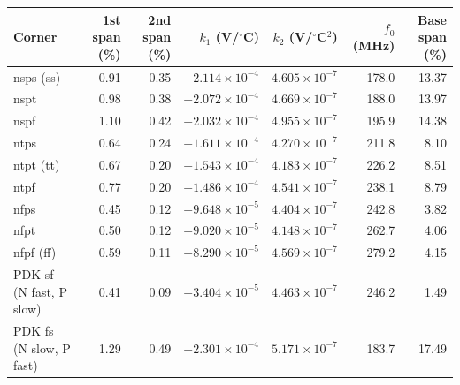 \begin{tabular}{lrrrrrr}\toprule
Corner & 1st span (\%) & 2nd span (\%) & $k_1$ (V/$^\circ$C) & $k_2$ (V/$^\circ$C$^2$) & $f_0$ (MHz) & Base span (\%) \\\midrule
nsps (ss) & 0.91 & 0.35 & $-2.114\times10^{-4}$ & $4.605\times10^{-7}$ & 178.0 & 13.37 \\
nspt & 0.98 & 0.38 & $-2.072\times10^{-4}$ & $4.669\times10^{-7}$ & 188.0 & 13.97 \\
nspf & 1.10 & 0.42 & $-2.032\times10^{-4}$ & $4.955\times10^{-7}$ & 195.9 & 14.38 \\
ntps & 0.64 & 0.24 & $-1.611\times10^{-4}$ & $4.270\times10^{-7}$ & 211.8 & 8.10 \\
ntpt (tt) & 0.67 & 0.20 & $-1.543\times10^{-4}$ & $4.183\times10^{-7}$ & 226.2 & 8.51 \\
ntpf & 0.77 & 0.20 & $-1.486\times10^{-4}$ & $4.541\times10^{-7}$ & 238.1 & 8.79 \\
nfps & 0.45 & 0.12 & $-9.648\times10^{-5}$ & $4.404\times10^{-7}$ & 242.8 & 3.82 \\
nfpt & 0.50 & 0.12 & $-9.020\times10^{-5}$ & $4.148\times10^{-7}$ & 262.7 & 4.06 \\
nfpf (ff) & 0.59 & 0.11 & $-8.290\times10^{-5}$ & $4.569\times10^{-7}$ & 279.2 & 4.15 \\
PDK sf (N fast, P slow) & 0.41 & 0.09 & $-3.404\times10^{-5}$ & $4.463\times10^{-7}$ & 246.2 & 1.49 \\
PDK fs (N slow, P fast) & 1.29 & 0.49 & $-2.301\times10^{-4}$ & $5.171\times10^{-7}$ & 183.7 & 17.49 \\
\bottomrule\end{tabular}